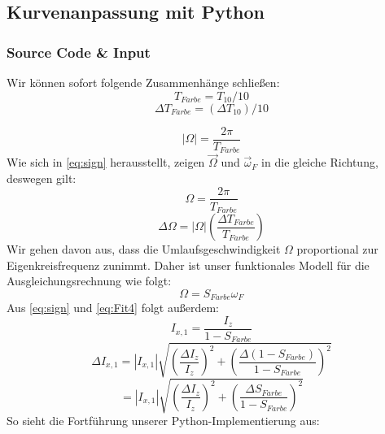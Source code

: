 \documentclass[a4paper,10pt]{article}
\begin{document}
\subsection{Kurvenanpassung mit Python}
\subsubsection{Source Code \& Input}
Wir können sofort folgende Zusammenhänge schließen:
\begin{equation} \label{eq:T_Farbe}
	T_{Farbe} = T_{10}/10
\end{equation} 
\begin{equation} \label{eq:DeltaT_Farbe}
	\Delta T_{Farbe} = (\Delta T_{10})/10
\end{equation} 

\begin{equation} \label{eq:absOmega}
	|\Omega| = \frac{2 \pi}{T_{Farbe}}
\end{equation} 
Wie sich in \eqref{eq:sign} herausstellt, zeigen \(\vec{\Omega}\) und \(\vec{\omega}_F\) in die gleiche Richtung, deswegen gilt:
\begin{equation} \label{eq:absOmega}
	\Omega= \frac{2 \pi}{T_{Farbe}} 
\end{equation} 
\begin{equation} \label{eq:DeltaOmega}
	\Delta \Omega = |\Omega|{\left( \frac{\Delta T_{Farbe}}{T_{Farbe}} \right)}
\end{equation} 
Wir gehen davon aus, dass die Umlaufsgeschwindigkeit \(\Omega\) proportional zur Eigenkreisfrequenz zunimmt.
Daher ist unser funktionales Modell für die Ausgleichungsrechnung wie folgt:
\begin{equation} \label{eq:Fit4}
	\boxed{\Omega = S_{Farbe} \omega_{F}}
\end{equation} 
Aus \eqref{eq:sign} und \eqref{eq:Fit4} folgt außerdem:
\begin{equation} \label{eq:I_x1}
	I_{x,1} = \frac{I_z}{1-{S_{Farbe}}}
\end{equation} 
\begin{equation*} \label{eq:DeltaI_x1}
	\Delta I_{x,1}  = |I_{x,1} | \sqrt{\left(\frac{\Delta I_z}{I_z}\right)^2+\left(\frac{\Delta (1-S_{Farbe})}{1-{S_{Farbe}}}\right)^2} 
\end{equation*} 
\begin{equation} \label{eq:DeltaI_x1}
	= |I_{x,1} | \sqrt{\left(\frac{\Delta I_z}{I_z}\right)^2+\left(\frac{\Delta S_{Farbe}}{1-{S_{Farbe}}}\right)^2}
\end{equation} 
So sieht die Fortführung unserer Python-Implementierung aus:\\
\end{document}
